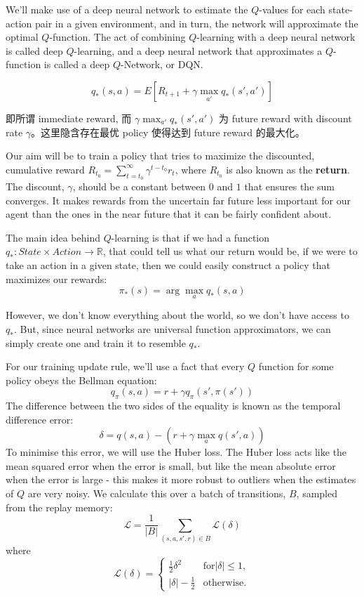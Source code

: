 We'll make use of a deep neural network to estimate the $Q$-values for each state-action 
pair in a given environment, and in turn, the network will approximate the optimal 
$Q$-function. The act of combining $Q$-learning with a deep neural network is called 
deep $Q$-learning, and a deep neural network that approximates a $Q$-function is called 
a deep $Q$-Network, or DQN.

\begin{equation}\label{eq:dqn_bellman_equation}
q_*(s,a) = E \left[ R_{t+1} + \gamma\max_{a'}q_*(s', a')
\right]
\end{equation}

\begin{emp_box}
 即所谓 immediate reward, 而 $\gamma\max_{a'}q_*(s', a')$ 为 future reward with 
discount rate $\gamma$。这里隐含存在最优 policy 使得达到 future reward 的最大化。
\end{emp_box}

Our aim will be to train a policy that tries to maximize the discounted, cumulative 
reward $R_{t_0} = \sum_{t=t_0}^{\infty} \gamma^{t - t_0} r_t$, where $R_{t_0}$ is also 
known as the {\bf return}. The discount, $\gamma$, should be a constant between $0$ and 
$1$ that ensures the sum converges. It makes rewards from the uncertain far future less 
important for our agent than the ones in the near future that it can be fairly confident 
about.

\begin{emp_box}
The main idea behind $Q$-learning is that if we had a function 
$q_*: State \times Action \rightarrow \mathbb{R}$, that could tell us what our return 
would be, if we were to take an action in a given state, then we could easily construct 
a policy that maximizes our rewards:
$$
\pi_*(s) = \arg\max_a q_*(s,a)
$$
\end{emp_box}

However, we don't know everything about the world, so we don't have access to $q_*$. 
But, since neural networks are universal function approximators, we can simply create 
one and train it to resemble $q_*$.

For our training update rule, we'll use a fact that every $Q$ function for some policy 
obeys the Bellman equation:
$$
q_\pi(s,a) = r + \gamma q_\pi(s', \pi(s'))
$$
\noindent{}The difference between the two sides of the equality is known as the temporal 
difference error:
$$
\delta = q(s,a) - (r + \gamma \max_a q(s', a))
$$
\noindent{}To minimise this error, we will use the Huber loss. The Huber loss acts like 
the mean squared error when the error is small, but like the mean absolute error when 
the error is large - this makes it more robust to outliers when the estimates of $Q$ 
are very noisy. We calculate this over a batch of transitions, $B$, sampled from the 
replay memory:
$$
\mathcal{L} = \frac{1}{|B|} \sum_{(s,a,s',r)\in B} \mathcal{L}(\delta)
$$
\noindent{}where
$$
\mathcal{L}(\delta) = \begin{cases}
\frac{1}{2}\delta^2 &\text{for} |\delta| \leq 1, \\
|\delta| - \frac{1}{2} &\text{otherwise.}
\end{cases}
$$

